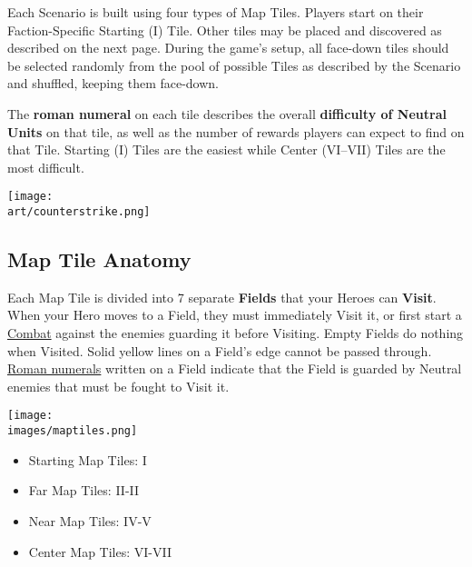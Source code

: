 
\begin{multicols*}{2}
Each Scenario is built using four types of Map Tiles.
Players start on their Faction-Specific Starting (I) Tile.
Other tiles may be placed and discovered as described on the next page.
During the game's setup, all face-down tiles should be selected randomly from the pool of possible Tiles as described by the Scenario and shuffled, keeping them face-down.\par
The \textbf{roman numeral} on each tile describes the overall \textbf{difficulty of Neutral Units} on that tile, as well as the number of rewards players can expect to find on that Tile.
Starting (I) Tiles are the easiest while Center (VI–VII) Tiles are the most difficult.\par

\vfill
\begin{center}
  \texttt{[image: \\art/counterstrike.png]}
\end{center}
\vfill

\subsection*{Map Tile Anatomy}
Each Map Tile is divided into 7 separate \textbf{Fields} that your Heroes can \textbf{Visit}.
When your Hero moves to a Field, they must immediately Visit it, or
first start a \hyperlink{Combat}{Combat} against the enemies guarding it before Visiting.
Empty Fields do nothing when Visited.
Solid yellow lines on a Field's edge cannot be passed through.
\hyperlink{Difficulty}{Roman numerals} written on a Field indicate that the Field is guarded by Neutral enemies that must be fought to Visit it.\par
\columnbreak
\texttt{[image: \\images/maptiles.png]}
\begin{itemize}
  \footnotesize
  \item[\textbf{1.}] Starting Map Tiles: I
  \item[\textbf{2.}] Far Map Tiles: II-II
  \item[\textbf{3.}] Near Map Tiles: IV-V
  \item[\textbf{4.}] Center Map Tiles: VI-VII
\end{itemize}


\end{multicols*}
